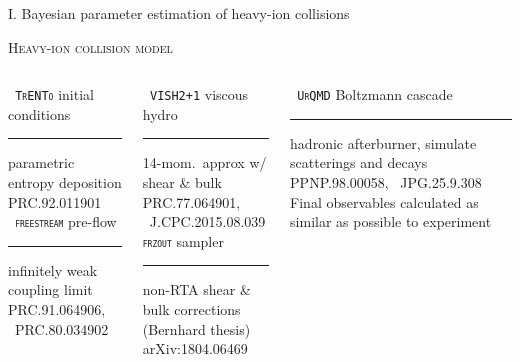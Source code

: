 \documentclass[aspectratio=169]{beamer}
\begin{document}
\begin{frame}
  \begin{center}
    \Large I. Bayesian parameter estimation of heavy-ion collisions
  \end{center}
\end{frame}

\begin{frame}[t]{\scshape Heavy-ion collision model}
  \centering
  \medskip
  \begin{columns}[T]
    \begin{column}{0.3\textwidth}
      \texttt{\scshape\color{theme} TrENTo} {\small initial conditions}\\
      \smallskip\hrule\medskip
      {\scriptsize parametric entropy deposition}\\
      {\tiny \color{theme}PRC.92.011901}\\[2ex]
      \texttt{\scshape\color{theme} freestream} {\small pre-flow}\\
      \smallskip\hrule\medskip
      {\scriptsize infinitely weak coupling limit}\\
      {\tiny \color{theme} PRC.91.064906, ~PRC.80.034902}
    \end{column}
    \hfill
    \begin{column}{0.3\textwidth}
      \texttt{\scshape\color{theme} VISH2+1} {\small viscous hydro}\\
      \smallskip\hrule\medskip
      {\scriptsize 14-mom.\ approx w/ shear \& bulk}\\
      {\tiny \color{theme} PRC.77.064901, ~J.CPC.2015.08.039}\\[2ex]
      \texttt{\scshape\color{theme}frzout} {\small sampler}\\
      \smallskip\hrule\medskip
      {\scriptsize non-RTA shear \& bulk corrections}\\
      {\tiny \color{theme} (Bernhard thesis) arXiv:1804.06469}
    \end{column}
    \hfill
    \begin{column}{0.3\textwidth}
      \texttt{\scshape\color{theme} UrQMD} {\small Boltzmann cascade}
      \smallskip\hrule\medskip
      {\scriptsize hadronic afterburner, simulate scatterings and decays}\\
      {\tiny\color{theme} PPNP.98.00058, ~JPG.25.9.308}\\[2ex]
      {\scriptsize Final observables calculated as similar as possible to experiment}
    \end{column}
  \end{columns}
\end{frame}
\end{document}
